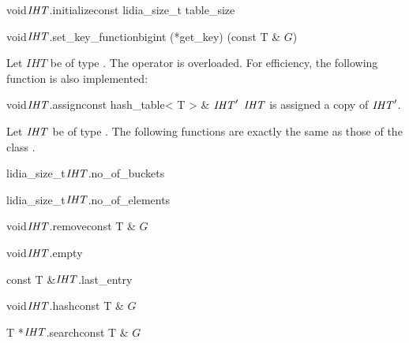 \begin{fcode}{void}{$\mathit{IHT}$.initialize}{const lidia_size_t table_size}
\end{fcode}

\begin{fcode}{void}{$\mathit{IHT}$.set_key_function}{bigint (*get_key) (const T & $G$)}
\end{fcode}



\ASGN

Let $IHT$ be of type .  The operator \code{=} is overloaded.  For
efficiency, the following function is also implemented:

\begin{fcode}{void}{$\mathit{IHT}$.assign}{const hash_table< T > & $\mathit{IHT}'$}
  $\mathit{IHT}$ is assigned a copy of $\mathit{IHT}'$.
\end{fcode}



\ACCS

Let $\mathit{IHT}$ be of type .  The following functions are exactly the
same as those of the class .

\begin{cfcode}{lidia_size_t}{$\mathit{IHT}$.no_of_buckets}{}
\end{cfcode}

\begin{cfcode}{lidia_size_t}{$\mathit{IHT}$.no_of_elements}{}
\end{cfcode}

\begin{fcode}{void}{$\mathit{IHT}$.remove}{const T & $G$}
\end{fcode}

\begin{fcode}{void}{$\mathit{IHT}$.empty}{}
\end{fcode}

\begin{cfcode}{const T &}{$\mathit{IHT}$.last_entry}{}
\end{cfcode}

\begin{fcode}{void}{$\mathit{IHT}$.hash}{const T & $G$}
\end{fcode}

\begin{cfcode}{T *}{$\mathit{IHT}$.search}{const T & $G$}
\end{cfcode}

